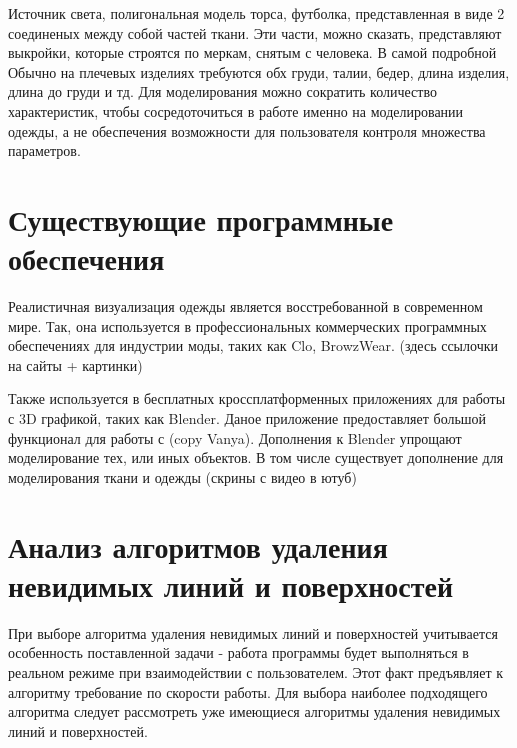 Источник света, полигональная модель торса, футболка, представленная в виде
2 соединеных между собой частей ткани. Эти части, можно сказать, представляют
выкройки, которые строятся по меркам, снятым с человека. В самой подробной Обычно на плечевых
изделиях требуются обх груди, талии, бедер, длина изделия, длина до груди и тд.
Для моделирования можно сократить количество характеристик, чтобы
сосредоточиться в работе именно на моделировании одежды, а не обеспечения
возможности для пользователя контроля множества параметров.



\section{Существующие программные обеспечения}

Реалистичная визуализация одежды является восстребованной в современном мире.
Так, она используется в профессиональных коммерческих программных обеспечениях
для индустрии моды, таких как Clo, BrowzWear. (здесь ссылочки на сайты + картинки)

Также используется в бесплатных кроссплатформенных приложениях для работы с 3D
графикой, таких как Blender. Даное приложение предоставляет большой функционал
для работы с (copy Vanya). Дополнения к Blender упрощают моделирование тех, или
иных объектов. В том числе существует дополнение для моделирования ткани и одежды
(скрины с видео в ютуб)

\section{Анализ алгоритмов удаления невидимых линий и поверхностей}

При выборе алгоритма удаления невидимых линий и поверхностей учитывается особенность поставленной задачи - работа программы будет выполняться в реальном режиме при взаимодействии с пользователем. Этот факт предъявляет к алгоритму требование по скорости работы. Для выбора наиболее подходящего алгоритма следует рассмотреть уже имеющиеся алгоритмы удаления невидимых линий и поверхностей.

